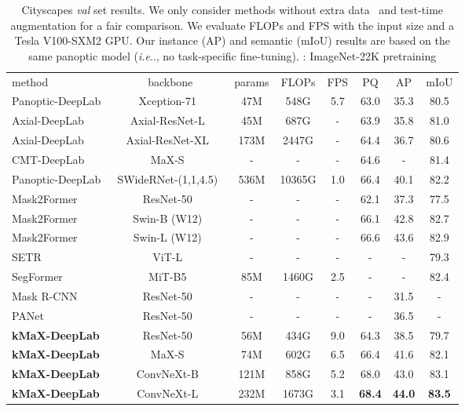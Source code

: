 \documentclass[runningheads]{llncs}
\makeatletter
\DeclareRobustCommand\onedot{\futurelet\@let@token\@onedot}
\def\@onedot{\ifx\@let@token.\else.\null\fi\xspace}
\def\ie{\emph{i.e}\onedot} \def\Ie{\emph{I.e}\onedot}
\newcommand{\tablestyle}[2]{\setlength{\tabcolsep}{#1}\renewcommand{\arraystretch}{#2}\centering\footnotesize}
\makeatother
\begin{document}
\begin{table*}[!t]
\centering
\small
\caption{Cityscapes \textit{val} set results. We only consider methods without extra data~\cite{lin2014microsoft,neuhold2017mapillary} and test-time augmentation for a fair comparison. We evaluate FLOPs and FPS with the input size  and a Tesla V100-SXM2 GPU. Our instance (AP) and semantic (mIoU) results are based on the same panoptic model (\ie, no task-specific fine-tuning). : ImageNet-22K pretraining
}
\tablestyle{0.75pt}{0.75}
\begin{tabular}{l|c|ccc|ccc}
method & backbone & params & FLOPs & FPS & PQ & AP & mIoU\\
\shline
Panoptic-DeepLab~\cite{cheng2019panoptic} & Xception-71~\cite{chollet2016xception} & 47M & 548G & 5.7 & 63.0 & 35.3 & 80.5 \\
Axial-DeepLab~\cite{wang2020axial} & Axial-ResNet-L~\cite{wang2020axial} & 45M & 687G & - & 63.9 & 35.8 & 81.0 \\
Axial-DeepLab~\cite{wang2020axial} & Axial-ResNet-XL~\cite{wang2020axial} & 173M & 2447G & - & 64.4 & 36.7 & 80.6 \\
CMT-DeepLab~\cite{yu2022cmt} & MaX-S~\cite{wang2021max} & - & - & - & 64.6 & - & 81.4 \\
Panoptic-DeepLab~\cite{cheng2019panoptic} & SWideRNet-(1,1,4.5)~\cite{swidernet_2020} & 536M & 10365G & 1.0 & 66.4 & 40.1 & 82.2 \\
\hline
Mask2Former~\cite{cheng2021masked} & ResNet-50~\cite{he2016deep} & - & - & - & 62.1 & 37.3 & 77.5 \\
Mask2Former~\cite{cheng2021masked} & Swin-B (W12)~\cite{liu2021swin} & - & - & -  & 66.1 & 42.8 & 82.7 \\
Mask2Former~\cite{cheng2021masked} & Swin-L (W12)~\cite{liu2021swin} & - & - & -  & 66.6 & 43.6 & 82.9 \\
\hline
SETR~\cite{zheng2021rethinking} & ViT-L~\cite{dosovitskiy2020image} & - & - & - & - & - & 79.3 \\
SegFormer~\cite{xie2021segformer} & MiT-B5~\cite{xie2021segformer} & 85M & 1460G & 2.5 & - & - & 82.4 \\
\hline
Mask R-CNN~\cite{he2017mask} & ResNet-50~\cite{he2016deep} & - & - & - & - & 31.5 & - \\
PANet~\cite{liu2018path} & ResNet-50~\cite{he2016deep} & - & - & - & - & 36.5 & - \\
\hline \hline
\textbf{kMaX-DeepLab} & ResNet-50~\cite{he2016deep} & 56M & 434G & 9.0 & 64.3 & 38.5 & 79.7 \\
\textbf{kMaX-DeepLab} & MaX-S~\cite{wang2021max} & 74M & 602G & 6.5 & 66.4 & 41.6 & 82.1 \\
\textbf{kMaX-DeepLab}  & ConvNeXt-B~\cite{liu2022convnet} & 121M & 858G & 5.2 & 68.0 & 43.0 & 83.1 \\
\textbf{kMaX-DeepLab} & ConvNeXt-L~\cite{liu2022convnet} & 232M & 1673G & 3.1 & \textbf{68.4} & \textbf{44.0} & \textbf{83.5} \\
\end{tabular}
\label{tab:cityscapes_val_test}
\end{table*}
\end{document}
